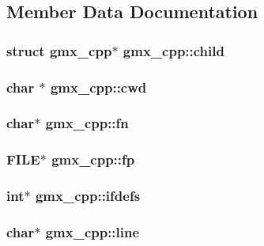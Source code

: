 \subsection{\-Member \-Data \-Documentation}
\hypertarget{structgmx__cpp_a33923f110091a48feaa7f86d91320c96}{
\subsubsection[{child}]{\setlength{\rightskip}{0pt plus 5cm}struct {\bf gmx\-\_\-cpp}$\ast$ {\bf gmx\-\_\-cpp\-::child}}}\label{structgmx__cpp_a33923f110091a48feaa7f86d91320c96}
\hypertarget{structgmx__cpp_af7a5643d6930e6af1479ecd86ffb4de1}{
\subsubsection[{cwd}]{\setlength{\rightskip}{0pt plus 5cm}char $\ast$ {\bf gmx\-\_\-cpp\-::cwd}}}\label{structgmx__cpp_af7a5643d6930e6af1479ecd86ffb4de1}
\hypertarget{structgmx__cpp_a5a970988b516749dd1022a00cbd89dd2}{
\subsubsection[{fn}]{\setlength{\rightskip}{0pt plus 5cm}char$\ast$ {\bf gmx\-\_\-cpp\-::fn}}}\label{structgmx__cpp_a5a970988b516749dd1022a00cbd89dd2}
\hypertarget{structgmx__cpp_a1d285a6d3dafa1c414094c6e52008891}{
\subsubsection[{fp}]{\setlength{\rightskip}{0pt plus 5cm}\-F\-I\-L\-E$\ast$ {\bf gmx\-\_\-cpp\-::fp}}}\label{structgmx__cpp_a1d285a6d3dafa1c414094c6e52008891}
\hypertarget{structgmx__cpp_ae8f421f7015c6bbe2a7aea6fb1443a9b}{
\subsubsection[{ifdefs}]{\setlength{\rightskip}{0pt plus 5cm}int$\ast$ {\bf gmx\-\_\-cpp\-::ifdefs}}}\label{structgmx__cpp_ae8f421f7015c6bbe2a7aea6fb1443a9b}
\hypertarget{structgmx__cpp_acfd2b231193f357427893872850534fc}{
\subsubsection[{line}]{\setlength{\rightskip}{0pt plus 5cm}char$\ast$ {\bf gmx\-\_\-cpp\-::line}}}\label{structgmx__cpp_acfd2b231193f357427893872850534fc}
